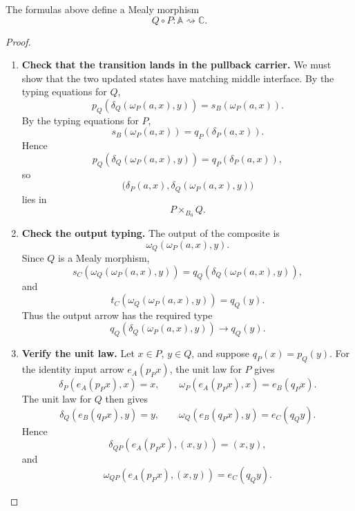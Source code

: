 \begin{proposition}
\label{prop:pipeline-composition-mealy}
    The formulas above define a Mealy morphism
    \[
        Q\circ P:\mathbb A\rightsquigarrow\mathbb C.
    \]
\end{proposition}
\begin{proof}
    \leavevmode
    \begin{enumerate}
        \item \textbf{Check that the transition lands in the pullback carrier.} We must show that the two updated states have matching middle interface. By the typing equations for \(Q\),
        \[
            p_Q(\delta_Q(\omega_P(a,x),y))
            =
            s_B(\omega_P(a,x)).
        \]
        By the typing equations for \(P\),
        \[
            s_B(\omega_P(a,x))
            =
            q_P(\delta_P(a,x)).
        \]
        Hence
        \[
            p_Q(\delta_Q(\omega_P(a,x),y))
            =
            q_P(\delta_P(a,x)),
        \]
        so
        \[
            \bigl(
            \delta_P(a,x),
            \delta_Q(\omega_P(a,x),y)
            \bigr)
        \]
        lies in
        \[
            P\times_{B_0}Q.
        \]

        \item \textbf{Check the output typing.} The output of the composite is
        \[
            \omega_Q(\omega_P(a,x),y).
        \]
        Since \(Q\) is a Mealy morphism,
        \[
            s_C(\omega_Q(\omega_P(a,x),y))
            =
            q_Q(\delta_Q(\omega_P(a,x),y)),
        \]
        and
        \[
            t_C(\omega_Q(\omega_P(a,x),y))
            =
            q_Q(y).
        \]
        Thus the output arrow has the required type
        \[
            q_Q(\delta_Q(\omega_P(a,x),y))\to q_Q(y).
        \]

        \item \textbf{Verify the unit law.} Let \(x\in P\), \(y\in Q\), and suppose \(q_P(x)=p_Q(y)\). For the identity input arrow \(e_A(p_Px)\), the unit law for \(P\) gives
        \[
            \delta_P(e_A(p_Px),x)=x,
            \qquad
            \omega_P(e_A(p_Px),x)=e_B(q_Px).
        \]
        The unit law for \(Q\) then gives
        \[
            \delta_Q(e_B(q_Px),y)=y,
            \qquad
            \omega_Q(e_B(q_Px),y)=e_C(q_Qy).
        \]
        Hence
        \[
            \delta_{QP}(e_A(p_Px),(x,y))=(x,y),
        \]
        and
        \[
            \omega_{QP}(e_A(p_Px),(x,y))=e_C(q_Qy).
        \]


\end{enumerate}
\end{proof}
